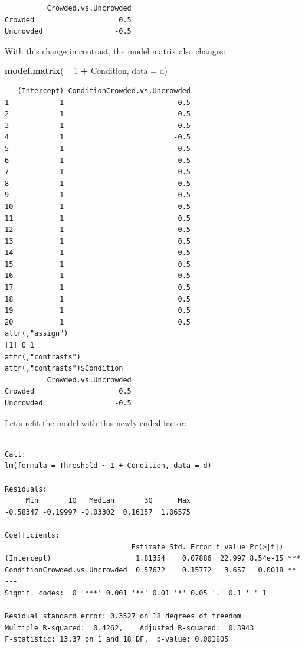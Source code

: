 \documentclass[
]{article}
\newenvironment{Shaded}{\begin{snugshade}}{\end{snugshade}}
\newcommand{\DataTypeTok}[1]{\textcolor[rgb]{0.13,0.29,0.53}{#1}}
\newcommand{\DecValTok}[1]{\textcolor[rgb]{0.00,0.00,0.81}{#1}}
\newcommand{\KeywordTok}[1]{\textcolor[rgb]{0.13,0.29,0.53}{\textbf{#1}}}
\newcommand{\NormalTok}[1]{#1}
\newcommand{\OperatorTok}[1]{\textcolor[rgb]{0.81,0.36,0.00}{\textbf{#1}}}
\newcommand{\StringTok}[1]{\textcolor[rgb]{0.31,0.60,0.02}{#1}}
\begin{document}
\footnotesize

\begin{verbatim}
          Crowded.vs.Uncrowded
Crowded                    0.5
Uncrowded                 -0.5
\end{verbatim}

\normalsize

With this change in contrast, the model matrix also changes:

\footnotesize

\begin{Shaded}
\begin{Highlighting}[]
\KeywordTok{model.matrix}\NormalTok{( }\OperatorTok{~}\StringTok{ }\DecValTok{1} \OperatorTok{+}\StringTok{ }\NormalTok{Condition, }\DataTypeTok{data =}\NormalTok{ d)}
\end{Highlighting}
\end{Shaded}

\begin{verbatim}
   (Intercept) ConditionCrowded.vs.Uncrowded
1            1                          -0.5
2            1                          -0.5
3            1                          -0.5
4            1                          -0.5
5            1                          -0.5
6            1                          -0.5
7            1                          -0.5
8            1                          -0.5
9            1                          -0.5
10           1                          -0.5
11           1                           0.5
12           1                           0.5
13           1                           0.5
14           1                           0.5
15           1                           0.5
16           1                           0.5
17           1                           0.5
18           1                           0.5
19           1                           0.5
20           1                           0.5
attr(,"assign")
[1] 0 1
attr(,"contrasts")
attr(,"contrasts")$Condition
          Crowded.vs.Uncrowded
Crowded                    0.5
Uncrowded                 -0.5
\end{verbatim}

\normalsize

Let's refit the model with this newly coded factor:

\footnotesize

\begin{verbatim}

Call:
lm(formula = Threshold ~ 1 + Condition, data = d)

Residuals:
     Min       1Q   Median       3Q      Max 
-0.58347 -0.19997 -0.03302  0.16157  1.06575 

Coefficients:
                              Estimate Std. Error t value Pr(>|t|)    
(Intercept)                    1.81354    0.07886  22.997 8.54e-15 ***
ConditionCrowded.vs.Uncrowded  0.57672    0.15772   3.657   0.0018 ** 
---
Signif. codes:  0 '***' 0.001 '**' 0.01 '*' 0.05 '.' 0.1 ' ' 1

Residual standard error: 0.3527 on 18 degrees of freedom
Multiple R-squared:  0.4262,    Adjusted R-squared:  0.3943 
F-statistic: 13.37 on 1 and 18 DF,  p-value: 0.001805
\end{verbatim}
\end{document}
